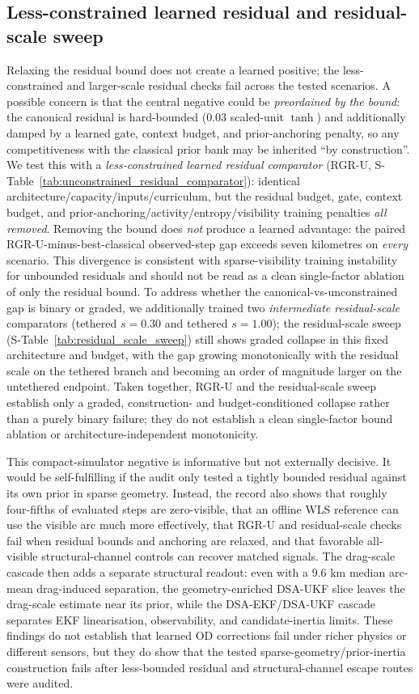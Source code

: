 \documentclass{article}
\begin{document}
\subsection{Less-constrained learned residual and residual-scale sweep}
Relaxing the residual bound does not create a learned positive; the less-constrained and larger-scale residual checks fail across the tested scenarios.
A possible concern is that the central negative could be \emph{preordained by the bound}: the canonical residual is hard-bounded ($0.03$ scaled-unit \(\tanh\)) and additionally damped by a learned gate, context budget, and prior-anchoring penalty, so any competitiveness with the classical prior bank may be inherited ``by construction''. We test this with a \emph{less-constrained learned residual comparator} (RGR-U, S-Table~\ref{tab:unconstrained_residual_comparator}): identical architecture/capacity/inputs/curriculum, but the residual budget, gate, context budget, and prior-anchoring/activity/entropy/visibility training penalties \emph{all removed}. Removing the bound does \emph{not} produce a learned advantage: the paired RGR-U-minus-best-classical observed-step gap exceeds seven kilometres on \emph{every} scenario. This divergence is consistent with sparse-visibility training instability for unbounded residuals and should not be read as a clean single-factor ablation of only the residual bound. To address whether the canonical-vs-unconstrained gap is binary or graded, we additionally trained two \emph{intermediate residual-scale} comparators (tethered $s=0.30$ and tethered $s=1.00$); the residual-scale sweep (S-Table~\ref{tab:residual_scale_sweep}) still shows graded collapse in this fixed architecture and budget, with the gap growing monotonically with the residual scale on the tethered branch and becoming an order of magnitude larger on the untethered endpoint. Taken together, RGR-U and the residual-scale sweep establish only a graded, construction- and budget-conditioned collapse rather than a purely binary failure; they do not establish a clean single-factor bound ablation or architecture-independent monotonicity.

This compact-simulator negative is informative but not externally decisive. It would be self-fulfilling if the audit only tested a tightly bounded residual against its own prior in sparse geometry. Instead, the record also shows that roughly four-fifths of evaluated steps are zero-visible, that an offline WLS reference can use the visible arc much more effectively, that RGR-U and residual-scale checks fail when residual bounds and anchoring are relaxed, and that favorable all-visible structural-channel controls can recover matched signals. The drag-scale cascade then adds a separate structural readout: even with a 9.6 km median arc-mean drag-induced separation, the geometry-enriched DSA-UKF slice leaves the drag-scale estimate near its prior, while the DSA-EKF/DSA-UKF cascade separates EKF linearisation, observability, and candidate-inertia limits. These findings do not establish that learned OD corrections fail under richer physics or different sensors, but they do show that the tested sparse-geometry/prior-inertia construction fails after less-bounded residual and structural-channel escape routes were audited.
\end{document}
